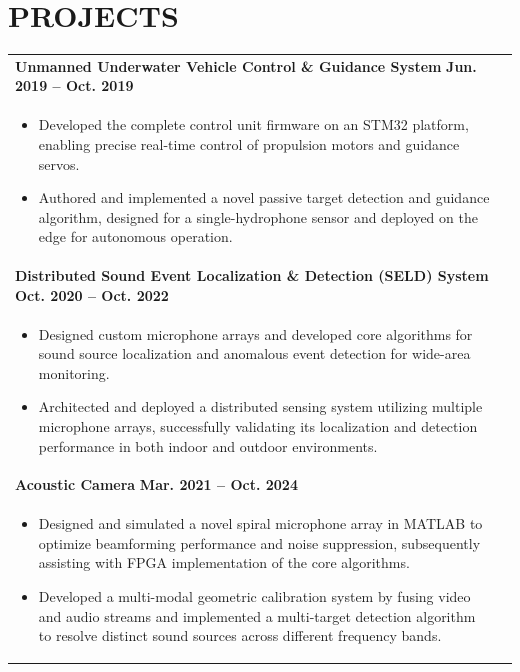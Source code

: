 \documentclass[a4paper,8pt]{article}
\begin{document}
\section{\textbf{PROJECTS}}
\begin{tabularx}{\linewidth}{ @{}l r@{} }

\textbf{Unmanned Underwater Vehicle Control \& Guidance System} \hfill \textbf{Jun. 2019 -- Oct. 2019}\\[1pt]
\begin{minipage}[t]{\linewidth}
    \begin{itemize}[nosep,after=\strut, leftmargin=1em, itemsep=2pt]
        \item Developed the complete control unit firmware on an STM32 platform, enabling precise real-time control of propulsion motors and guidance servos.
        \item Authored and implemented a novel passive target detection and guidance algorithm, designed for a single-hydrophone sensor and deployed on the edge for autonomous operation. 
    \end{itemize}
\end{minipage}
\\[4pt]

\textbf{Distributed Sound Event Localization \& Detection (SELD) System} \hfill \textbf{Oct. 2020 -- Oct. 2022}\\[1pt]
\begin{minipage}[t]{\linewidth}
    \begin{itemize}[nosep,after=\strut, leftmargin=1em, itemsep=2pt]
        \item Designed custom microphone arrays and developed core algorithms for sound source localization and anomalous event detection for wide-area monitoring.
        \item Architected and deployed a distributed sensing system utilizing multiple microphone arrays, successfully validating its localization and detection performance in both indoor and outdoor environments. 
    \end{itemize}
\end{minipage}
\\[4pt]

\textbf{Acoustic Camera} \hfill \textbf{Mar. 2021 -- Oct. 2024}\\[1pt]
\begin{minipage}[t]{\linewidth}
    \begin{itemize}[nosep,after=\strut, leftmargin=1em, itemsep=2pt]
        \item Designed and simulated a novel spiral microphone array in MATLAB to optimize beamforming performance and noise suppression, subsequently assisting with FPGA implementation of the core algorithms.
        \item Developed a multi-modal geometric calibration system by fusing video and audio streams and implemented a multi-target detection algorithm to resolve distinct sound sources across different frequency bands.
    \end{itemize}
\end{minipage}
\\[4pt]


\end{tabularx}
\end{document}
